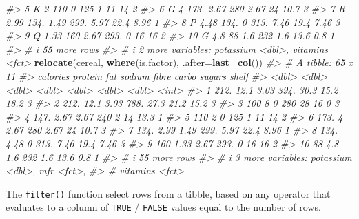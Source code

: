 \documentclass[
]{book}
\newenvironment{Shaded}{\begin{snugshade}}{\end{snugshade}}
\newcommand{\AttributeTok}[1]{\textcolor[rgb]{0.13,0.29,0.53}{#1}}
\newcommand{\CommentTok}[1]{\textcolor[rgb]{0.56,0.35,0.01}{\textit{#1}}}
\newcommand{\FunctionTok}[1]{\textcolor[rgb]{0.13,0.29,0.53}{\textbf{#1}}}
\newcommand{\NormalTok}[1]{#1}
\begin{document}
\begin{Shaded}
\begin{Highlighting}[]
\CommentTok{\#\textgreater{}  5 K        2     110   0      125   1     11    14        2}
\CommentTok{\#\textgreater{}  6 G        4     173.  2.67   280   2.67  24    10.7      3}
\CommentTok{\#\textgreater{}  7 R        2.99  134.  1.49   299.  5.97  22.4   8.96     1}
\CommentTok{\#\textgreater{}  8 P        4.48  134.  0      313.  7.46  19.4   7.46     3}
\CommentTok{\#\textgreater{}  9 Q        1.33  160   2.67   293.  0     16    16        2}
\CommentTok{\#\textgreater{} 10 G        4.8    88   1.6    232   1.6   13.6   0.8      1}
\CommentTok{\#\textgreater{} \# i 55 more rows}
\CommentTok{\#\textgreater{} \# i 2 more variables: potassium \textless{}dbl\textgreater{}, vitamins \textless{}fct\textgreater{}}
\FunctionTok{relocate}\NormalTok{(cereal, }\FunctionTok{where}\NormalTok{(is.factor), }\AttributeTok{.after=}\FunctionTok{last\_col}\NormalTok{())}
\CommentTok{\#\textgreater{} \# A tibble: 65 x 11}
\CommentTok{\#\textgreater{}    calories protein   fat sodium fibre carbo sugars shelf}
\CommentTok{\#\textgreater{}       \textless{}dbl\textgreater{}   \textless{}dbl\textgreater{} \textless{}dbl\textgreater{}  \textless{}dbl\textgreater{} \textless{}dbl\textgreater{} \textless{}dbl\textgreater{}  \textless{}dbl\textgreater{} \textless{}int\textgreater{}}
\CommentTok{\#\textgreater{}  1     212.   12.1   3.03   394. 30.3   15.2  18.2      3}
\CommentTok{\#\textgreater{}  2     212.   12.1   3.03   788. 27.3   21.2  15.2      3}
\CommentTok{\#\textgreater{}  3     100     8     0      280  28     16     0        3}
\CommentTok{\#\textgreater{}  4     147.    2.67  2.67   240   2     14    13.3      1}
\CommentTok{\#\textgreater{}  5     110     2     0      125   1     11    14        2}
\CommentTok{\#\textgreater{}  6     173.    4     2.67   280   2.67  24    10.7      3}
\CommentTok{\#\textgreater{}  7     134.    2.99  1.49   299.  5.97  22.4   8.96     1}
\CommentTok{\#\textgreater{}  8     134.    4.48  0      313.  7.46  19.4   7.46     3}
\CommentTok{\#\textgreater{}  9     160     1.33  2.67   293.  0     16    16        2}
\CommentTok{\#\textgreater{} 10      88     4.8   1.6    232   1.6   13.6   0.8      1}
\CommentTok{\#\textgreater{} \# i 55 more rows}
\CommentTok{\#\textgreater{} \# i 3 more variables: potassium \textless{}dbl\textgreater{}, mfr \textless{}fct\textgreater{},}
\CommentTok{\#\textgreater{} \#   vitamins \textless{}fct\textgreater{}}
\end{Highlighting}
\end{Shaded}

The \texttt{filter()} function select rows from a tibble, based on any operator that evaluates to a column of \texttt{TRUE} / \texttt{FALSE} values equal to the number of rows.
\end{document}
